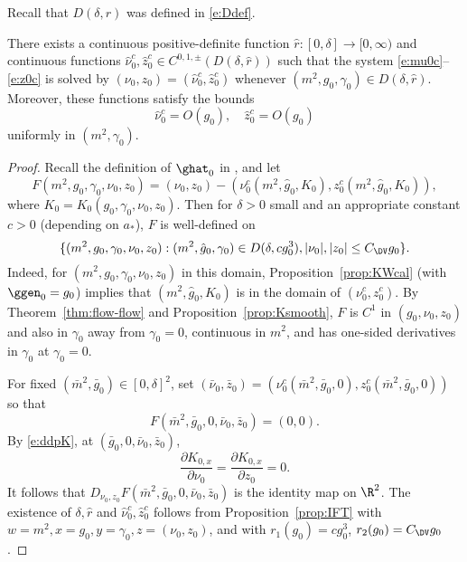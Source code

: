 Recall that $D(\delta, r)$ was defined in \eqref{e:Ddef}.

\begin{prop}
\label{prop:nuzhat}
There exists a continuous positive-definite function $\hat r : [0, \delta] \to [0, \infty)$
and continuous functions
$\hat\nu_0^c, \hat z_0^c \in C^{0,1,\pm}(D(\delta, \hat r))$ such that
the system \eqref{e:mu0c}--\eqref{e:z0c} is solved by $(\nu_0, z_0) = (\hat\nu_0^c, \hat z_0^c)$
whenever $(m^2, g_0, \gamma_0) \in D(\delta, \hat r)$.
Moreover, these functions satisfy the bounds
\begin{equation}
\label{e:hat-est-re}
\hat\nu_0^c = O(g_0),
\quad
\hat z_0^c = O(g_0)
\end{equation}
uniformly in $(m^2, \gamma_0)$.
\end{prop}

\begin{proof}
Recall the definition of $\ghat_0$ in , and
let
\begin{equation}
F(m^2, g_0, \gamma_0, \nu_0, z_0)
= (\nu_0, z_0)
  -
  (\nu_0^c(m^2, \hat g_0, K_0),
  z_0^c(m^2, \hat g_0, K_0)
),
\end{equation}
where $K_0 = K_0(g_0, \gamma_0, \nu_0, z_0)$.
Then for $\delta > 0$ small and an appropriate constant $c > 0$ (depending on $a_*$),
$F$ is well-defined on
\begin{equation}
\{ (m^2, g_0, \gamma_0, \nu_0, z_0) : (m^2, \hat g_0, \gamma_0) \in D(\delta, c g_0^3),
|\nu_0|, |z_0| \leq C_\DV g_0 \}.
\end{equation}
Indeed, for $(m^2, g_0, \gamma_0, \nu_0, z_0)$ in this domain,
Proposition~\ref{prop:KWcal} (with $\ggen_0 = g_0$) implies that $(m^2, \hat g_0, K_0)$ is in the domain of
$(\nu_0^c, z_0^c)$.
By Theorem~\ref{thm:flow-flow} and Proposition~\ref{prop:Ksmooth},
$F$ is $C^1$ in $(g_0, \nu_0, z_0)$
and also in $\gamma_0$ away from $\gamma_0 = 0$,
continuous in $m^2$, and has one-sided derivatives in $\gamma_0$ at $\gamma_0 = 0$.

For fixed $(\bar m^2, {\bar g_0}) \in [0, \delta]^2$,
set $({\bar\nu_0}, \bar z_0) = (\nu_0^c(\bar m^2, \bar g_0, 0), z_0^c(\bar m^2, \bar g_0, 0))$
so that
\begin{equation}
F(\bar m^2, \bar g_0, 0, \bar\nu_0, \bar z_0) = (0, 0).
\end{equation}
By \eqref{e:ddpK}, at $(\bar g_0, 0, \bar\nu_0, \bar z_0)$,
\begin{equation}
\frac{\partial K_{0,x}}{\partial\nu_0}
= \frac{\partial K_{0,x}}{\partial z_0} = 0.
\end{equation}
It follows that $D_{\nu_0,z_0} F(\bar m^2, \bar g_0, 0, \bar\nu_0, \bar z_0)$
is the identity map on $\R^2$.
The existence of $\delta, \hat r$ and $\hat\nu_0^c, \hat z_0^c$
follows from Proposition~\ref{prop:IFT} with
$w = m^2, x = g_0, y = \gamma_0, z = (\nu_0, z_0)$,
and with $r_1(g_0) = c g_0^3$, $r_2(g_0) = C_\DV g_0$.


\end{proof}

